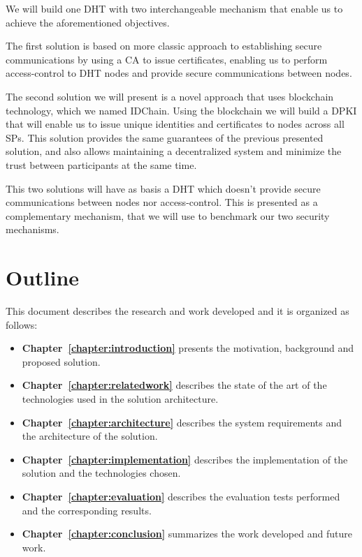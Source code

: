 We will build one DHT with two interchangeable mechanism that enable us to achieve the aforementioned objectives.

The first solution is based on more classic approach to establishing secure communications by using a \ac{CA} to issue certificates, enabling us to perform access-control to \ac{DHT} nodes and provide secure communications between nodes.

The second solution we will present is a novel approach that uses blockchain technology, which we named IDChain.
Using the blockchain we will build a \ac{DPKI} that will enable us to issue unique identities and certificates to nodes across all \acp{SP}.
This solution provides the same guarantees of the previous presented solution, and also allows maintaining a decentralized system and minimize the trust between participants at the same time.

This two solutions will have as basis a \ac{DHT} which doesn't provide secure communications between nodes nor access-control.
This is presented as a complementary mechanism, that we will use to benchmark our two security mechanisms.

\section{Outline}
This document describes the research and work developed and it is organized as follows:

\begin{itemize}
  \item \textbf{Chapter~\ref{chapter:introduction}} presents the motivation, background and proposed solution.
  \item \textbf{Chapter~\ref{chapter:relatedwork}} describes the state of the art of the technologies used in the solution architecture.
  \item \textbf{Chapter~\ref{chapter:architecture}} describes the system requirements and the architecture of the solution.
  \item \textbf{Chapter~\ref{chapter:implementation}} describes the implementation of the solution and the technologies chosen.
  \item \textbf{Chapter~\ref{chapter:evaluation}} describes the evaluation tests performed and the corresponding results.
  \item \textbf{Chapter~\ref{chapter:conclusion}} summarizes the work developed and future work.
\end{itemize}

\cleardoublepage
